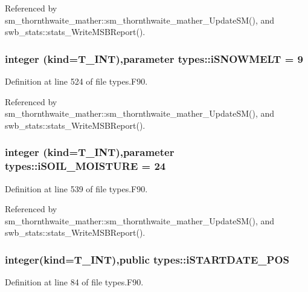 Referenced by sm\_\-thornthwaite\_\-mather::sm\_\-thornthwaite\_\-mather\_\-UpdateSM(), and swb\_\-stats::stats\_\-WriteMSBReport().

\hypertarget{namespacetypes_a356a0c0b5930e94118b467d1f7b486f2}{
\subsubsection[{iSNOWMELT}]{\setlength{\rightskip}{0pt plus 5cm}integer (kind={\bf T\_\-INT}),parameter {\bf types::iSNOWMELT} = 9}}
\label{namespacetypes_a356a0c0b5930e94118b467d1f7b486f2}


Definition at line 524 of file types.F90.



Referenced by sm\_\-thornthwaite\_\-mather::sm\_\-thornthwaite\_\-mather\_\-UpdateSM(), and swb\_\-stats::stats\_\-WriteMSBReport().

\hypertarget{namespacetypes_a71556e5a3ff6e981beafd59949100334}{
\subsubsection[{iSOIL\_\-MOISTURE}]{\setlength{\rightskip}{0pt plus 5cm}integer (kind={\bf T\_\-INT}),parameter {\bf types::iSOIL\_\-MOISTURE} = 24}}
\label{namespacetypes_a71556e5a3ff6e981beafd59949100334}


Definition at line 539 of file types.F90.



Referenced by sm\_\-thornthwaite\_\-mather::sm\_\-thornthwaite\_\-mather\_\-UpdateSM(), and swb\_\-stats::stats\_\-WriteMSBReport().

\hypertarget{namespacetypes_a95d527e2c66739a080d7d76bb1ae6b97}{
\subsubsection[{iSTARTDATE\_\-POS}]{\setlength{\rightskip}{0pt plus 5cm}integer(kind={\bf T\_\-INT}),public {\bf types::iSTARTDATE\_\-POS}}}
\label{namespacetypes_a95d527e2c66739a080d7d76bb1ae6b97}


Definition at line 84 of file types.F90.



